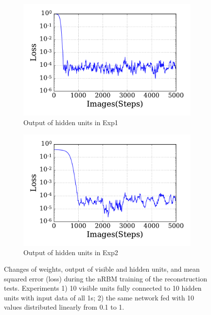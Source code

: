 \begin{figure}
\begin{subfigure}[t]{0.48\textwidth}
		\DIFaddendFL \includegraphics[width=\textwidth]{pics_sdlm/30_exp_RBM/exp1_loss.pdf}
		\caption{Output of hidden units in Exp1}
	\end{subfigure}
	\DIFdelbeginFL %
\DIFdelendFL \DIFaddbeginFL \begin{subfigure}[t]{0.48\textwidth}
		\DIFaddendFL \includegraphics[width=\textwidth]{pics_sdlm/30_exp_RBM/exp2_loss.pdf}
		\caption{Output of hidden units in Exp2}
	\end{subfigure}
	\DIFdelbeginFL %
\DIFdelendFL \DIFaddbeginFL \caption[nRBM training of the reconstruction tests.]{\DIFaddendFL Changes of weights, output of visible and hidden units, and mean squared error (loss) during the nRBM training of the reconstruction tests. 
		Experiments 1) 10 visible units fully connected to 10 hidden units with input data of all 1s; 2) the same network fed with 10 values distributed linearly from 0.1 to 1.}
	\label{fig:rbm_orig}
\end{figure}

